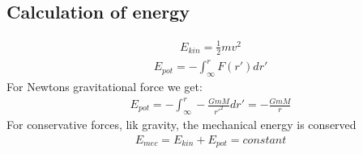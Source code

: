 \documentclass[american,a4paper,12pt]{article}
\begin{document}
\subsection{Calculation of energy}
\begin{align*}
    E_{kin} = \frac{1}{2}mv^2
\end{align*}
\begin{align*}
    E_{pot} = -\int_{\infty}^r F(r')dr'
\end{align*}
For Newtons gravitational force we get:
\begin{align*}
    E_{pot} = -\int_{\infty}^r -\frac{GmM}{r'^{2}}dr' = - \frac{GmM}{r}
\end{align*}
For conservative forces, lik gravity, the mechanical energy is conserved
\begin{align*}
    E_{mec} = E_{kin} + E_{pot} = constant
\end{align*}
\end{document}
